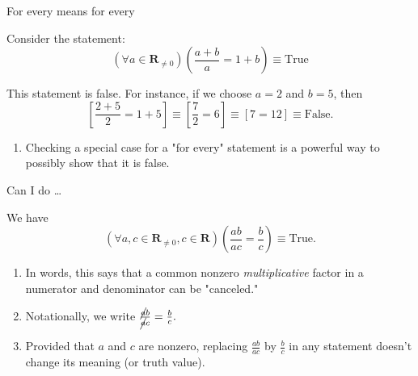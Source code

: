 \documentclass[portrait,fleqn,12pt]{beamer}
\newcommand{\reals}{\mathbf{R}}
\newenvironment{handlist}
   {\begin{enumerate}[\faHandPointRight]
       \addtolength{\itemsep}{0.0\itemsep}}
     {\end{enumerate}}
\begin{document}
\begin{frame}{For every means for every}

Consider the statement:
\begin{equation*}
  \left(\forall a \in \reals_{\neq 0} \right)\left(\frac{a+b}{a} = 1 + b \right) \equiv \text{True}
\end{equation*}

This statement is false. For instance, if we choose $a=2$ and $b=5$, then
\begin{equation*}
    \left[ \frac{2+5}{2} = 1+5 \right] \equiv   \left[ \frac{7}{2} = 6 \right]  \equiv \left[ 7 = 12\right]  \equiv \text{False}.
\end{equation*}

\begin{handlist}
\item Checking a special case for a "for every" statement is a powerful way to possibly show that it is false.
\end{handlist}

\end{frame}

\begin{frame}{Can I do \dots}

\begin{theorem} We have 
\begin{equation*} 
   \left(\forall a, c\in \reals_{\neq 0}, c \in \reals \right)\left(\frac{a b}{a c} = \frac{b}{c} \right) \equiv \text{True}.
  \end{equation*}
\end{theorem}

\begin{handlist}
\item In words, this says that a common nonzero \emph{multiplicative} factor in a numerator and denominator can be "canceled."
\item Notationally, we write 
$
\frac{\cancel{a} b}{ \cancel{a} c}  = \frac{b}{c}.
$
\item Provided that $a$ and $c$ are nonzero, replacing $\frac{ab}{ac}$ by $\frac{b}{c}$ in any statement doesn't change its meaning (or truth value).
\end{handlist}

\end{frame}
\end{document}
